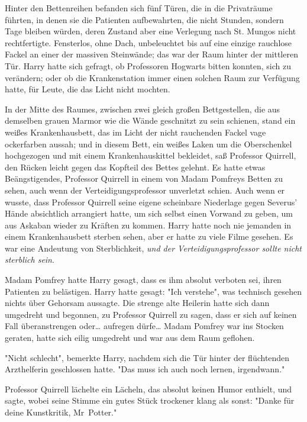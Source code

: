 {Hinter den Bettenreihen befanden sich fünf Türen, die in die Privaträume führten, in denen sie die Patienten aufbewahrten, die nicht Stunden, sondern Tage bleiben würden, deren Zustand aber eine Verlegung nach St. Mungos nicht rechtfertigte. Fensterlos, ohne Dach, unbeleuchtet bis auf eine einzige rauchlose Fackel an einer der massiven Steinwände; das war der Raum hinter der mittleren Tür. Harry hatte sich gefragt, ob Professoren Hogwarts bitten konnten, sich zu verändern; oder ob die Krankenstation immer einen solchen Raum zur Verfügung hatte, für Leute, die das Licht nicht mochten.

In der Mitte des Raumes, zwischen zwei gleich großen Bettgestellen, die aus demselben grauen Marmor wie die Wände geschnitzt zu sein schienen, stand ein weißes Krankenhausbett, das im Licht der nicht rauchenden Fackel vage ockerfarben aussah; und in diesem Bett, ein weißes Laken um die Oberschenkel hochgezogen und mit einem Krankenhauskittel bekleidet, saß Professor Quirrell, den Rücken leicht gegen das Kopfteil des Bettes gelehnt. Es hatte etwas Beängstigendes, Professor Quirrell in einem von Madam Pomfreys Betten zu sehen, auch wenn der Verteidigungsprofessor unverletzt schien. Auch wenn er wusste, dass Professor Quirrell seine eigene scheinbare Niederlage gegen Severus' Hände absichtlich arrangiert hatte, um sich selbst einen Vorwand zu geben, um aus Askaban wieder zu Kräften zu kommen. Harry hatte noch nie jemanden in einem Krankenhausbett sterben sehen, aber er hatte zu viele Filme gesehen. Es war eine Andeutung von Sterblichkeit, \emph{und der Verteidigungsprofessor sollte nicht sterblich sein}.

Madam Pomfrey hatte Harry gesagt, dass es ihm absolut verboten sei, ihren Patienten zu belästigen. Harry hatte gesagt: "Ich verstehe", was technisch gesehen nichts über Gehorsam aussagte. Die strenge alte Heilerin hatte sich dann umgedreht und begonnen, zu Professor Quirrell zu sagen, dass er sich auf keinen Fall überanstrengen oder… aufregen dürfe… Madam Pomfrey war ins Stocken geraten, hatte sich eilig umgedreht und war aus dem Raum geflohen.

"Nicht schlecht", bemerkte Harry, nachdem sich die Tür hinter der flüchtenden Arzthelferin geschlossen hatte. "Das muss ich auch noch lernen, irgendwann."

Professor Quirrell lächelte ein Lächeln, das absolut keinen Humor enthielt, und sagte, wobei seine Stimme ein gutes Stück trockener klang als sonst: "Danke für deine Kunstkritik, Mr~Potter."

}
